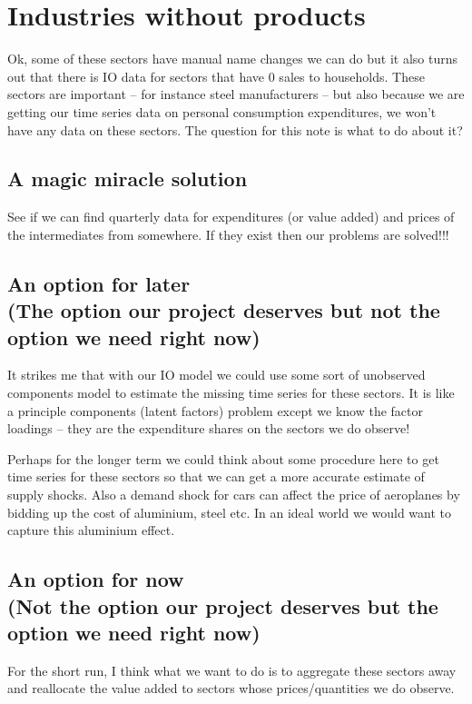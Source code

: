\documentclass[12pt,english]{article}
\begin{document}
\section{Industries without products}

Ok, some of these sectors have manual name changes we can do but it also turns out that there is IO data for sectors that have 0 sales to households. These sectors are important -- for instance steel manufacturers -- but also because we are getting our time series data on personal consumption expenditures, we won't have any data on these sectors. The question for this note is what to do about it?

\subsection{A magic miracle solution}

See if we can find quarterly data for expenditures (or value added) and prices of the intermediates from somewhere. If they exist then our problems are solved!!!


\subsection{An option for later\\{\small (The option our project deserves but not the option we need right now)}}
It strikes me that with our IO model we could use some sort of unobserved components model to estimate the missing time series for these sectors. It is like a principle components (latent factors) problem except we know the factor loadings -- they are the expenditure shares on the sectors we do observe!

Perhaps for the longer term we could think about some procedure here to get time series for these sectors so that we can get a more accurate estimate of supply shocks. Also a demand shock for cars can affect the price of aeroplanes by bidding up the cost of aluminium, steel etc. In an ideal world we would want to capture this aluminium effect.

\subsection{An option for now\\ {\small (Not the option our project deserves but the option we need right now)}}

For the short run, I think what we want to do is to aggregate these sectors away and reallocate the value added to sectors whose prices/quantities we do observe.
\end{document}
